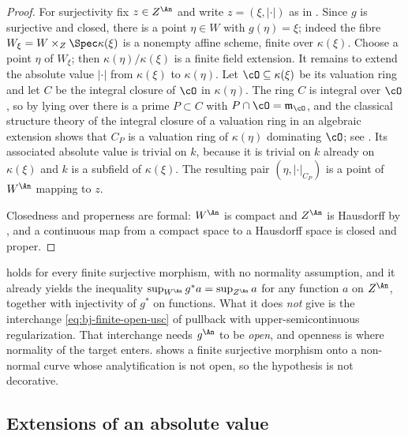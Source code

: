 \begin{proof}
For surjectivity fix $z\in Z^{\An}$ and write $z=(\xi,|\cdot|)$ as in
.  Since $g$ is surjective and closed, there is
a point $\eta\in W$ with $g(\eta)=\xi$; indeed the fibre
$W_\xi=W\times_Z\Spec\kappa(\xi)$ is a nonempty affine scheme, finite over
$\kappa(\xi)$.  Choose a point $\eta$ of $W_\xi$; then
$\kappa(\eta)/\kappa(\xi)$ is a finite field extension.  It remains to
extend the absolute value $|\cdot|$ from $\kappa(\xi)$ to
$\kappa(\eta)$.  Let $\cO\subseteq\kappa(\xi)$ be its valuation ring and
let $C$ be the integral closure of $\cO$ in $\kappa(\eta)$.  The ring
$C$ is integral over $\cO$, so by lying over there is a prime
$P\subset C$ with $P\cap\cO=\mathfrak m_{\cO}$, and the classical
structure theory of the integral closure of a valuation ring in an
algebraic extension shows that $C_P$ is a valuation ring of
$\kappa(\eta)$ dominating $\cO$; see
\cite[Chapter~VI, \S4 and \S11]{ZariskiSamuelII}.  Its associated absolute
value is trivial on $k$, because it is trivial on $k$ already on
$\kappa(\xi)$ and $k$ is a subfield of $\kappa(\xi)$.  The
resulting pair $(\eta,|\cdot|_{C_P})$ is a point of $W^{\An}$ mapping to
$z$.

Closedness and properness are formal: $W^{\An}$ is compact and
$Z^{\An}$ is Hausdorff by , and a
continuous map from a compact space to a Hausdorff space is closed and
proper.
\end{proof}

\begin{remark}
\label{rem:ch41-surjective-not-open}
 holds for every finite surjective
morphism, with no normality assumption, and it already yields the
inequality $\sup_{W^{\An}}g^*a=\sup_{Z^{\An}}a$ for any function $a$ on
$Z^{\An}$, together with injectivity of $g^*$ on functions.  What it
does \emph{not} give is the interchange
\eqref{eq:bj-finite-open-usc} of pullback with upper-semicontinuous
regularization.  That interchange needs $g^{\An}$ to be \emph{open}, and
openness is where normality of the target enters.
 shows a finite surjective morphism onto a
non-normal curve whose analytification is not open, so the hypothesis is not
decorative.
\end{remark}

\subsection{Extensions of an absolute value}
\label{sec:ch41-value-extension}

